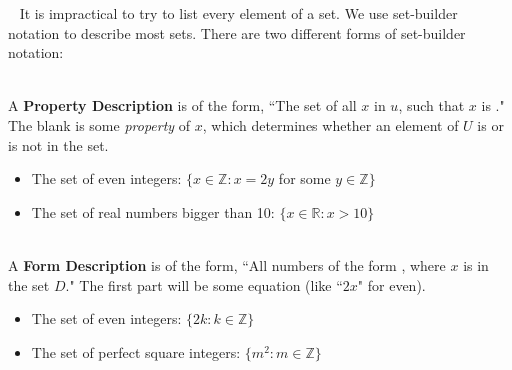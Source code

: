 \documentclass[a4paper,12pt]{book}
\begin{document}
        \begin{intro}{\ }
            It is impractical to try to list every element of a set.
            We use set-builder notation to describe most sets.
            There are two different forms of set-builder notation:

            ~\\
            A \textbf{Property Description} is of the form,
            ``The set of all $x$ in $u$, such that $x$ is \fitb."
            The blank is some \textit{property} of $x$, which
            determines whether an element of $U$ is or is not in the set.

            \begin{itemize}
                \item   The set of even integers:
                    $\{ x \in \mathbb{Z} : x = 2y$ for some $y \in \mathbb{Z} \}$
                \item   The set of real numbers bigger than 10:
                    $\{ x \in \mathbb{R} : x > 10 \}$
            \end{itemize}

            ~\\
            A \textbf{Form Description} is of the form,
            ``All numbers of the form \fitb, where $x$ is in the set $D$."
            The first part will be some equation (like ``$2x$" for even).

            \begin{itemize}
                \item   The set of even integers:
                    $\{ 2k : k \in \mathbb{Z} \}$
                \item   The set of perfect square integers:
                    $\{ m^{2} : m \in \mathbb{Z} \}$
            \end{itemize}
        \end{intro}
\end{document}
